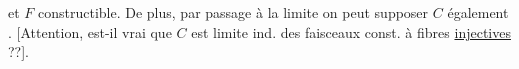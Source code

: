 et $F$ constructible. De plus, par passage à la limite on peut supposer  $C$ également . [Attention, est-il vrai que $C$ est limite ind.  des  faisceaux const. à fibres \uline{injectives} ??].
